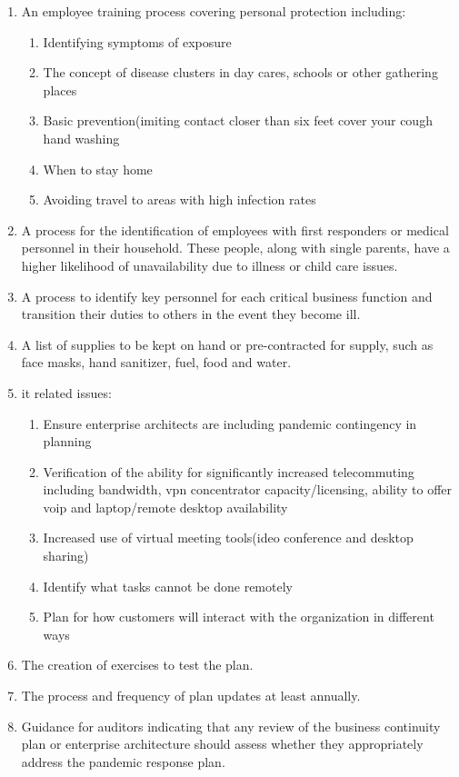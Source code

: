 \begin{enumerate}
\item 
An employee training process covering personal protection including:
\begin{enumerate}
\item 
Identifying symptoms of exposure
\item 
The concept of disease clusters in day cares, schools\oxford{} or other gathering places
\item 
Basic prevention\newline{}(imiting contact closer than six feet\oldnew{,}{;} cover your cough\oldnew{,}{;} hand washing\ins{; \etc}
\item When to stay home
\item Avoiding travel to areas with high infection rates
\end{enumerate}
\item 
A process for the identification of employees with first responders or medical personnel in their household.  
These people, along with single parents, have a higher likelihood of unavailability due to illness or child care issues.
\item 
A process to identify key personnel for each critical business function and transition their duties to others in the event they become ill.
\item 
A list of supplies to be kept on hand or pre-contracted for supply, such as face masks, hand sanitizer, fuel, food and water.
\item 
\gls{it} related issues:
\begin{enumerate}
\item 
Ensure enterprise architects are including pandemic contingency in planning
\item 
Verification of the ability for significantly increased telecommuting including bandwidth, \gls{vpn} concentrator capacity/licensing, ability to offer \gls{voip} and laptop/remote desktop availability
\item 
Increased use of virtual meeting tools\newline{}(ideo conference and desktop sharing)
\item 
Identify what tasks cannot be done remotely
\item 
Plan for how customers will interact with the organization in different ways
\end{enumerate}
\item
The creation of exercises to test the plan.
\item 
The process and frequency of plan updates at least annually.
\item 
Guidance for auditors indicating that any review of the business continuity plan or enterprise architecture should assess whether they appropriately address the \CompanyName{} pandemic response plan.
\end{enumerate}
\CommonPolicyCompliance
